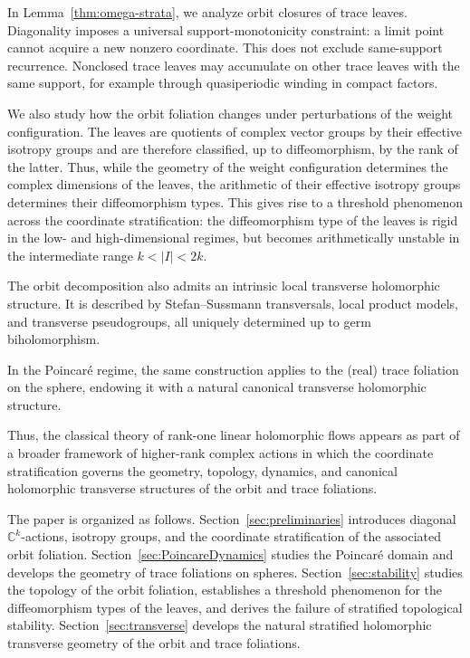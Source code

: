 \documentclass[11pt]{amsart}
\theoremstyle{definition}
\theoremstyle{remark}
\newcommand{\C}{\mathbb{C}}
\begin{document}
In Lemma~\ref{thm:omega-strata}, we analyze orbit closures of trace leaves.
Diagonality imposes a universal support-monotonicity constraint: a limit point cannot acquire a new nonzero coordinate.
This does not exclude same-support recurrence.
Nonclosed trace leaves may accumulate on other trace leaves with the same support, for example through quasiperiodic winding in compact factors.

We also study how the orbit foliation changes under perturbations of the weight configuration.
The leaves are quotients of complex vector groups by their effective isotropy groups and are therefore classified, up to diffeomorphism, by the rank of the latter.
Thus, while the geometry of the weight configuration determines the complex dimensions of the leaves, the arithmetic of their effective isotropy groups determines their diffeomorphism types.
This gives rise to a threshold phenomenon across the coordinate stratification: the diffeomorphism type of the leaves is rigid in the low- and high-dimensional regimes, but becomes arithmetically unstable in the intermediate range $k<|I|<2k$.

The orbit decomposition also admits an intrinsic local transverse holomorphic structure.
It is described by Stefan--Sussmann transversals, local product models, and transverse pseudogroups, all uniquely determined up to germ biholomorphism.

In the Poincaré regime, the same construction applies to the (real) trace foliation on the sphere, endowing it with a natural canonical transverse holomorphic structure.

Thus, the classical theory of rank-one linear holomorphic flows appears as part of a broader framework of higher-rank complex actions in which the coordinate stratification governs the geometry, topology, dynamics, and canonical holomorphic transverse structures of the orbit and trace foliations.

The paper is organized as follows.
Section~\ref{sec:preliminaries} introduces diagonal $\C^k$-actions, isotropy groups, and the coordinate stratification of the associated orbit foliation.
Section~\ref{sec:PoincareDynamics} studies the Poincaré domain and develops the geometry of trace foliations on spheres.
Section~\ref{sec:stability} studies the topology of the orbit foliation, establishes a threshold phenomenon for the diffeomorphism types of the leaves, and derives the failure of stratified topological stability.
Section~\ref{sec:transverse} develops the natural stratified holomorphic transverse geometry of the orbit and trace foliations.
\end{document}
